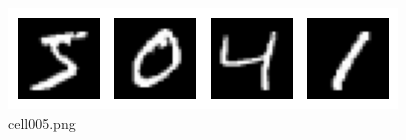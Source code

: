 \begin{figure}[ht]
	\centering
	\includegraphics[scale=0.8, max width=\linewidth]{./fig/energy-based-model/boltzmann-machine/cell005.png}
	\caption{cell005.png}
	\label{cell005.png}
\end{figure}